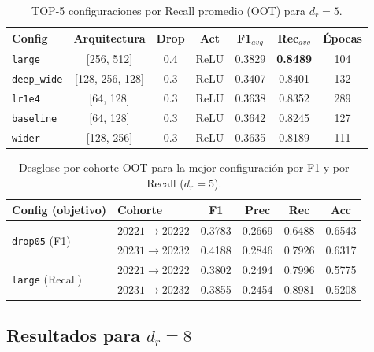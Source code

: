 \documentclass[11pt,a4paper]{article}
\begin{document}
\begin{table}[H]
\centering
\caption{TOP-5 configuraciones por Recall promedio (OOT) para $d_r=5$.}
\label{tab:top5_rec_rdim5}
\begin{tabular}{lcccccc}
\toprule
\textbf{Config} & \textbf{Arquitectura} & \textbf{Drop} & \textbf{Act} & \textbf{F1$_{avg}$} & \textbf{Rec$_{avg}$} & \textbf{Épocas} \\
\midrule
\texttt{large}      & [256, 512]   & 0.4 & ReLU  & 0.3829 & \textbf{0.8489} & 104 \\
\texttt{deep\_wide} & [128, 256, 128] & 0.3 & ReLU & 0.3407 & 0.8401 & 132 \\
\texttt{lr1e4}      & [64, 128]   & 0.3 & ReLU  & 0.3638 & 0.8352 & 289 \\
\texttt{baseline}   & [64, 128]   & 0.3 & ReLU  & 0.3642 & 0.8245 & 127 \\
\texttt{wider}      & [128, 256]  & 0.3 & ReLU  & 0.3635 & 0.8189 & 111 \\
\bottomrule
\end{tabular}
\end{table}

\begin{table}[H]
\centering
\caption{Desglose por cohorte OOT para la mejor configuración por F1 y por Recall ($d_r=5$).}
\label{tab:detalle_rdim5}
\begin{tabular}{llcccc}
\toprule
\textbf{Config (objetivo)} & \textbf{Cohorte} & \textbf{F1} & \textbf{Prec} & \textbf{Rec} & \textbf{Acc} \\
\midrule
\multirow{2}{*}{\texttt{drop05} (F1)}
  & $20221 \to 20222$ & 0.3783 & 0.2669 & 0.6488 & 0.6543 \\
  & $20231 \to 20232$ & 0.4188 & 0.2846 & 0.7926 & 0.6317 \\
\midrule
\multirow{2}{*}{\texttt{large} (Recall)}
  & $20221 \to 20222$ & 0.3802 & 0.2494 & 0.7996 & 0.5775 \\
  & $20231 \to 20232$ & 0.3855 & 0.2454 & 0.8981 & 0.5208 \\
\bottomrule
\end{tabular}
\end{table}

\subsection{Resultados para $d_r = 8$}
\end{document}
